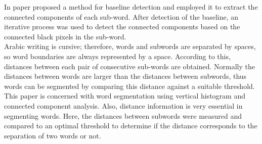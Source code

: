 In paper \cite{jawad_h_alkhateeb}
proposed a method for baseline detection and employed it to extract the connected components of each sub-word. After detection of the baseline, an iterative process was used to detect the connected components based on the connected black pixels in the sub-word. \\

\noindent
Arabic writing is cursive; therefore, words and subwords are separated by spaces, so word boundaries are always represented by a space. According  to  this, distances between each pair of consecutive sub-words are obtained. Normally the distances between words are larger than the distances between subwords, thus words can be segmented by comparing this distance against a suitable threshold. This paper is concerned with word segmentation using vertical histogram and connected component analysis. Also, distance  information is very essential in segmenting words. Here, the distances between subwords were measured and compared to an optimal threshold to determine if the distance corresponds to the separation of two words or not. 

